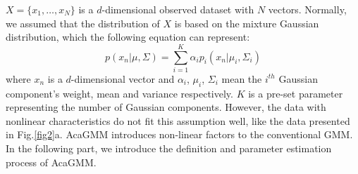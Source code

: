 \documentclass[journal]{IEEEtran}
\begin{document}
$X=\{x_1,\hdots,x_N\}$ is a $d$-dimensional observed dataset with $N$ vectors. Normally, we assumed that the distribution of $X$ is based on the mixture Gaussian distribution, which the following equation can represent:
\begin{equation}
    p(x_n|\mu,\Sigma)=\sum\limits^K_{i=1}\alpha_i p_i(x_n|\mu_i,\Sigma_i)
\end{equation}
where $x_n$ is a $d$-dimensional vector and $\alpha_i$, $\mu_i$, $\Sigma_i$ mean the $i^{th}$ Gaussian component's weight, mean and variance respectively. $K$ is a pre-set parameter representing the number of Gaussian components. However, the data with nonlinear characteristics do not fit this assumption well, like the data presented in Fig.\ref{fig2}a. AcaGMM introduces non-linear factors to the conventional GMM. In the following part, we introduce the definition and parameter estimation process of AcaGMM.
\end{document}
